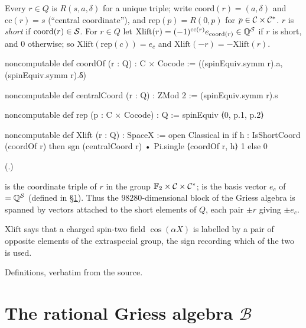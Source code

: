 \begin{definition}\label{ch21:def:Xlift}
Every $r\in Q$ is $R(s,a,\delta)$ for a unique triple; write $\mathrm{coord}(r)=(a,\delta)$ and
$\mathrm{cc}(r)=s$ (``central coordinate''), and $\mathrm{rep}(p)=R(0,p)$ for $p\in\mathcal{C}\times\mathcal{C}^*$.
$r$ is \emph{short} if $\mathrm{coord}(r)\in\mathcal{S}$.  For $r\in Q$ let
$\mathrm{Xlift}(r)=(-1)^{\mathrm{cc}(r)}e_{\mathrm{coord}(r)}\in{\mathbb{Q}}^{\mathcal{S}}$ if $r$ is short, and $0$
otherwise; so $\mathrm{Xlift}(\mathrm{rep}(c))=e_c$ and $\mathrm{Xlift}(-r)=-\mathrm{Xlift}(r)$.
\end{definition}
\begin{leancode}
noncomputable def coordOf (r : Q) : C × Cocode :=
  ((spinEquiv.symm r).a, (spinEquiv.symm r).δ)

noncomputable def centralCoord (r : Q) : ZMod 2 := (spinEquiv.symm r).s
\end{leancode}
\begin{leancode}
noncomputable def rep (p : C × Cocode) : Q := spinEquiv ⟨0, p.1, p.2⟩
\end{leancode}
\begin{leancode}
noncomputable def Xlift (r : Q) : SpaceX :=
  open Classical in
  if h : IsShortCoord (coordOf r) then sgn (centralCoord r) • Pi.single ⟨coordOf r, h⟩ 1 else 0
\end{leancode}
(.)
\begin{dictionary}
 is the coordinate triple of $r$ in the group
$\mathbb{F}_2\times\mathcal{C}\times\mathcal{C}^*$;  is the basis vector $e_c$ of
 $={\mathbb{Q}}^{\mathcal{S}}$ (defined in \S\ref{ch21:sec:spaceB}).  Thus the $98280$-dimensional
block of the Griess algebra is spanned by vectors attached to the short elements of $Q$, each pair
$\pm r$ giving $\pm e_c$.
\end{dictionary}
\begin{physics}
$\mathrm{Xlift}$ says that a charged spin-two field $\cos(\alpha X)$ is labelled by a pair of opposite
elements of the extraspecial group, the sign recording which of the two is used.
\end{physics}
\begin{status}
Definitions, verbatim from the source.
\end{status}

\section{The rational Griess algebra \texorpdfstring{$\mathcal B$}{B}}\label{ch21:sec:spaceB}

